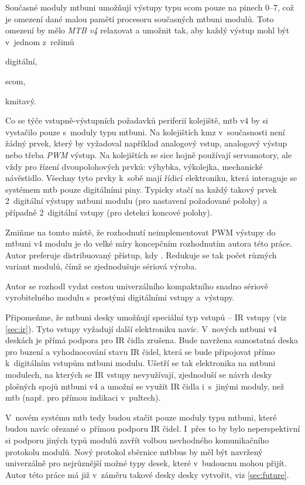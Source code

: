 Současné moduly \gls{mtbuni} umožňují výstupy typu \gls{scom} pouze na pinech
0–7, což je omezení dané malou pamětí procesoru současných \gls{mtbuni} modulů.
Toto omezení by mělo \textit{MTB v4} relaxovat a umožnit tak, aby každý výstup
mohl být v~jednom z~režimů

\begin{compactenum}
\item digitální,
\item \gls{scom},
\item kmitavý.
\end{compactenum}

Co se týče vstupně-výstupních požadavků periferií kolejiště, \gls{mtb} v4 by
si vystačilo pouze s~moduly typu \gls{mtbuni}. Na kolejištích \gls{kmz}
v~současnosti není žádný prvek, který by vyžadoval například analogový vstup,
analogový výstup nebo třeba \textit{PWM} výstup. Na kolejištích se sice hojně
používají servomotory, ale vždy pro řízení dvoupolohových prvků: výhybka,
výkolejka, mechanické návěstidlo. Všechny tyto prvky k~sobě mají řídicí
elektroniku, která interaguje se systémem \gls{mtb} pouze digitálními piny.
Typicky stačí na každý takový prvek 2~digitální výstupy \gls{mtbuni} modulu
(pro nastavení požadované polohy) a případně 2~digitální vstupy (pro detekci
koncové polohy).

Zmiňme na tomto místě, že rozhodnutí neimplementovat PWM výstupy do
\gls{mtbuni} v4 modulu je do velké míry koncepčním rozhodnutím autora této
práce. Autor preferuje distribuovaný přístup, kdy . Redukuje se tak počet různých variant modulů, čímž
se zjednodušuje sériová výroba.

Autor se rozhodl vydat cestou univerzálního
kompaktního snadno sériově vyrobitelného modulu s~prostými digitálními vstupy
a~výstupy.

Připomeňme, že \gls{mtbuni} desky umožňují speciální typ vstupů – IR vstupy
(viz \ref{sec:ir}). Tyto vstupy vyžadují další elektroniku navíc.  V~nových
\gls{mtbuni} v4 deskách je přímá podpora pro IR čidla zrušena. Bude navržena
samostatná deska pro buzení a vyhodnocování stavu IR čidel, která se bude
připojovat přímo k~digitálním vstupům \gls{mtbuni} modulu. Ušetří se tak
elektronika na \gls{mtbuni} modulech, na kterých se IR vstupy nevyužívají,
zjednoduší se návrh desky plošných spojů \gls{mtbuni} v4 a umožní se využít IR
čidla i~s~jinými moduly, než \gls{mtb} (např. pro přímou indikaci v~pultech).

V~novém systému \gls{mtb} tedy budou stačit pouze moduly typu \gls{mtbuni},
které budou navíc ořezané o~přímou podporu IR čidel. I~přes to by bylo
neperspektivní si podporu jiných typů modulů zavřít volbou nevhodného
komunikačního protokolu modulů. Nový protokol sběrnice \gls{mtbbus} by měl být
navržený univerzálně pro nejrůznější možné typy desek, které v~budoucnu mohou
přijít.  Autor této práce má již v~záměru takové desky desky vytvořit, viz
\ref{sec:future}.

